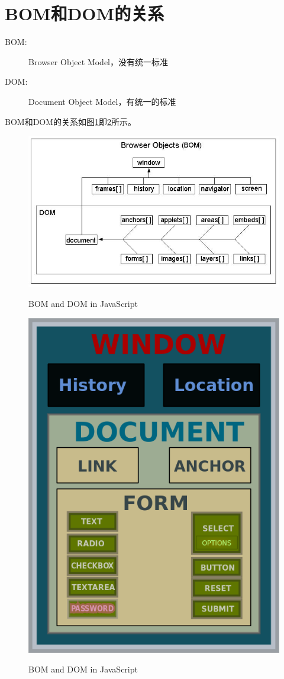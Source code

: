 ﻿\section[BOM和DOM的关系]{BOM和DOM的关系}
\begin{description}
  \item[BOM: ] Browser Object Model，没有统一标准
  \item[DOM: ] Document Object Model，有统一的标准
\end{description}

BOM和DOM的关系如图\ref{fig:bom_and_dom}即\ref{fig:bom_and_dom_2}所示。
\begin{figure}
  \centering
  \includegraphics[width=.8\textwidth]{picturedir/js_bom_dom.jpg}\\
  \caption{BOM and DOM in JavaScript}\label{fig:bom_and_dom}
\end{figure}

\begin{figure}
  \centering
  \includegraphics[width=.5\textwidth]{picturedir/js_bom_dom_2.png}\\
  \caption{BOM and DOM in JavaScript}\label{fig:bom_and_dom_2}
\end{figure}


